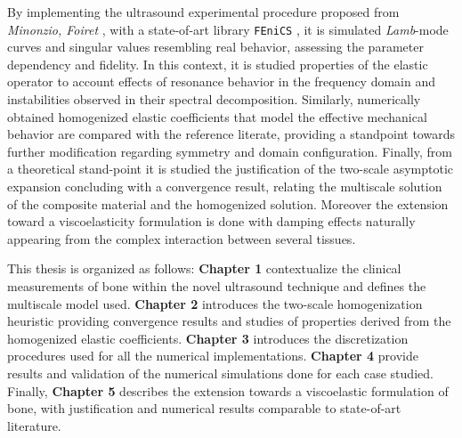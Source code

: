 \begin{intro}

By implementing the ultrasound experimental procedure proposed from \textit{Minonzio, Foiret} \cite{Foiret2014}, \cite{Minonzio2018} with a state-of-art library \texttt{FEniCS} \cite{logg2012automated}, it is simulated  \textit{Lamb}-mode curves and singular values resembling real behavior, assessing the parameter dependency and fidelity. In this context, it is studied properties of the elastic operator to account effects of resonance behavior in the frequency domain and instabilities observed in their spectral decomposition.
Similarly, numerically obtained homogenized elastic coefficients that model the effective mechanical behavior are compared with the reference literate, providing a standpoint towards further modification regarding symmetry and domain configuration.
Finally, from a theoretical stand-point it is studied the justification of the two-scale asymptotic expansion concluding with a convergence result, relating the multiscale solution of the composite material and the homogenized solution. Moreover the extension toward a viscoelasticity formulation is done with damping effects naturally appearing from the complex interaction between several tissues.

This thesis is organized as follows: \textbf{Chapter 1} contextualize the clinical measurements of bone within the novel ultrasound technique and defines the multiscale model used. \textbf{Chapter 2} introduces the two-scale homogenization heuristic providing convergence results and studies of properties derived from the homogenized elastic coefficients. \textbf{Chapter 3} introduces the discretization procedures used for all the numerical implementations. \textbf{Chapter 4} provide results and validation of the numerical simulations done for each case studied. Finally, \textbf{Chapter 5} describes the extension towards a viscoelastic formulation of bone, with justification and numerical results comparable to state-of-art literature.

\end{intro}